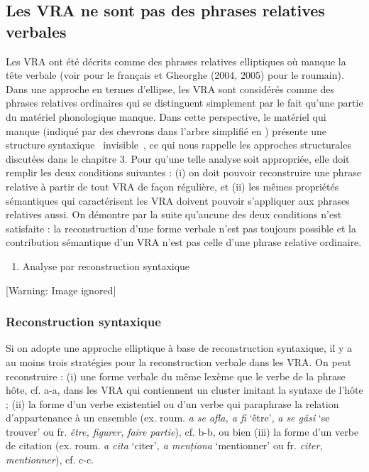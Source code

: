 \subsection{Les VRA ne sont pas des phrases relatives verbales}
\label{bkm:Ref294028428}Les VRA ont été décrits comme des phrases relatives elliptiques où manque la tête verbale (voir \citet{Grevisse1993} pour le français et Gheorghe (2004, 2005) pour le roumain). Dans une approche en termes d'ellipse, les VRA sont considérés comme des phrases relatives ordinaires qui se distinguent simplement par le fait qu'une partie du matériel phonologique manque. Dans cette perspective, le matériel qui manque (indiqué par des chevrons dans l'arbre simplifié en ) présente une structure syntaxique {\guillemotleft}~invisible~{\guillemotright}, ce qui nous rappelle les approches structurales discutées dans le chapitre 3. Pour qu'une telle analyse soit appropriée, elle doit remplir les deux conditions suivantes : (i) on doit pouvoir reconstruire une phrase relative à partir de tout VRA de façon régulière, et (ii) les mêmes propriétés sémantiques qui caractérisent les VRA doivent pouvoir s'appliquer aux phrases relatives aussi. On démontre par la suite qu'aucune des deux conditions n'est satisfaite : la reconstruction d'une forme verbale n'est pas toujours possible et la contribution sémantique d'un VRA n'est pas celle d'une phrase relative ordinaire. 


\begin{enumerate}
\item \label{bkm:Ref295496296}Analyse par reconstruction syntaxique 


\end{enumerate}
{   [Warning: Image ignored] %
} 

\subsubsection{Reconstruction syntaxique}
Si on adopte une approche elliptique à base de reconstruction syntaxique, il y a au moins trois stratégies pour la reconstruction verbale dans les VRA. On peut reconstruire : (i) une forme verbale du même lexème que le verbe de la phrase hôte, cf. a-a, dans les VRA qui contiennent un cluster imitant la syntaxe de l'hôte ; (ii) la forme d'un verbe existentiel ou d'un verbe qui paraphrase la relation d'appartenance à un ensemble (ex. roum. \textit{a se afla, a fi} `être', \textit{a se găsi} `se trouver' ou fr. \textit{être, figurer,} \textit{faire partie}), cf. b-b, ou bien (iii) la forme d'un verbe de citation (ex. roum. \textit{a cita} `citer'\textit{, a menționa} `mentionner' ou fr. \textit{citer, mentionner}), cf. c-c.


